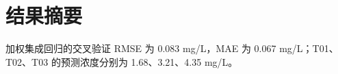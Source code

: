 \section{结果摘要}
加权集成回归的交叉验证 RMSE 为 0.083 mg/L，MAE 为 0.067 mg/L；T01、T02、T03 的预测浓度分别为 1.68、3.21、4.35 mg/L。
